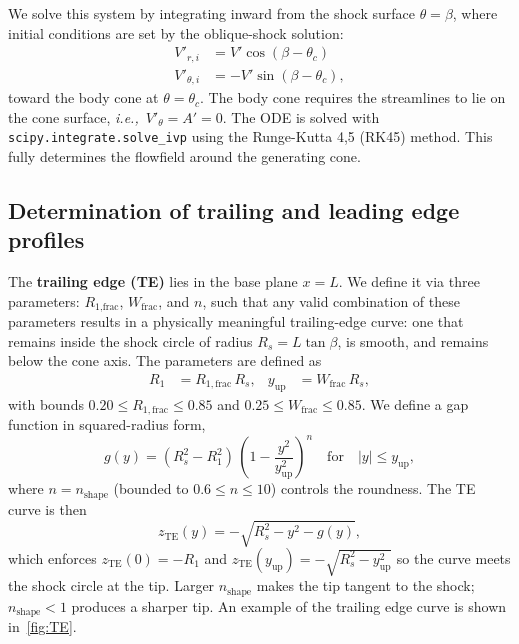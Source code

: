 \documentclass[10pt,a4paper]{article}
\begin{document}
We solve this system by integrating inward from the shock surface $\theta = \beta$, where initial conditions are set by the oblique-shock solution:
\begin{align}
    V'_{r,i} &= V' \cos(\beta - \theta_c)\label{eq:Vri} \\
    V'_{\theta,i} &= -V' \sin(\beta - \theta_c),\label{eq:Vthetai}
\end{align}
toward the body cone at $\theta=\theta_c$. The body cone requires the streamlines to lie on the cone surface, \textit{i.e.,}\ $V'_\theta = A' = 0$. The ODE is solved with \texttt{scipy.integrate.solve\_ivp} using the Runge-Kutta 4,5 (RK45) method. This fully determines the flowfield around the generating cone.

\subsection{Determination of trailing and leading edge profiles}\label{sec:LE}

The \textbf{trailing edge (TE)} lies in the base plane $x = L$. We define it via three parameters: $R_\text{1,frac}$, $W_\text{frac}$, and $n$, such that any valid combination of these parameters results in a physically meaningful trailing-edge curve: one that remains inside the shock circle of radius $R_s = L\tan\beta$, is smooth, and remains below the cone axis. The parameters are defined as
\begin{align}
    R_1 &= R_{1,\mathrm{frac}}\,R_s, & y_{\mathrm{up}} &= W_{\mathrm{frac}}\,R_s,
\end{align}
with bounds $0.20 \le R_{1,\mathrm{frac}} \le 0.85$ and $0.25 \le W_{\mathrm{frac}} \le 0.85$. We define a gap function in squared-radius form,
\begin{equation}
    g(y) = (R_s^2 - R_1^2)\,\left(1 - \frac{y^2}{y_{\mathrm{up}}^2}\right)^{n}
    \quad\text{for}\quad |y| \le y_{\mathrm{up}},
\end{equation}
where $n = n_{\mathrm{shape}}$ (bounded to $0.6 \le n \le 10$) controls the roundness.  The TE curve is then
\begin{equation}
    z_{\mathrm{TE}}(y) = -\sqrt{R_s^2 - y^2 - g(y)},
    \label{eq:TE}
\end{equation}
which enforces $z_{\mathrm{TE}}(0) = -R_1$ and $z_{\mathrm{TE}}(y_{\mathrm{up}}) = -\sqrt{R_s^2 - y_{\mathrm{up}}^2}$ so the curve meets the shock circle at the tip.  Larger $n_{\mathrm{shape}}$ makes the tip tangent to the shock; $n_{\mathrm{shape}} < 1$ produces a sharper tip. An example of the trailing edge curve is shown in~\cref{fig:TE}.
\end{document}
